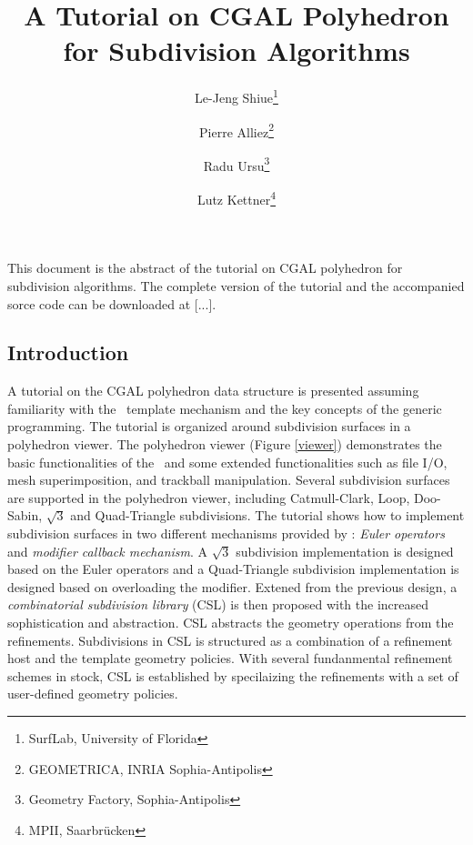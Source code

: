\documentclass[letter,twocolumn]{article}
\begin{document}
\date{}
\title{{\LARGE {\sffamily\bfseries A Tutorial on CGAL Polyhedron \\
                                   for Subdivision Algorithms}}}


\author{\small
\sffamily Le-Jeng Shiue\footnote{SurfLab, University of Florida}
\and \small
\sffamily Pierre Alliez\footnote{GEOMETRICA, INRIA Sophia-Antipolis}
\and \small
\sffamily Radu Ursu\footnote{Geometry Factory, Sophia-Antipolis}
\and \small
\sffamily Lutz Kettner\footnote{MPII, Saarbr\"ucken}}
\maketitle

\thispagestyle{empty}

{\scriptsize
This document is the abstract of the tutorial on CGAL
polyhedron for subdivision algorithms. The complete 
version of the tutorial and the accompanied sorce code 
can be downloaded at [...].
}

\subsection*{Introduction}

A tutorial on the CGAL polyhedron data structure
is presented assuming familiarity with the \CC\ 
template mechanism and the key concepts of the generic 
programming. The tutorial is organized around
subdivision surfaces in a polyhedron viewer.
The polyhedron viewer (Figure \ref{viewer}) demonstrates the
basic functionalities of the \cgalpoly\ and some extended
functionalities such as file I/O, mesh superimposition, and trackball
manipulation. Several subdivision surfaces are supported
in the polyhedron viewer, including Catmull-Clark, Loop, 
Doo-Sabin, $\sqrt{3}$ and Quad-Triangle subdivisions. 
The tutorial shows how to implement subdivision
surfaces in two different mechanisms provided by \cgalpoly :
\emph{Euler operators} and \emph{modifier callback mechanism}. 
A $\sqrt{3}$ subdivision implementation is designed based on the
Euler operators and a Quad-Triangle subdivision implementation
is designed based on overloading the modifier.  
Extened from the previous design, a 
\emph{combinatorial subdivision library} (CSL) is
then proposed with the increased sophistication and 
abstraction. CSL abstracts the geometry operations from 
the refinements. Subdivisions in CSL is structured as a 
combination of a refinement host and the template geometry 
policies. With several fundanmental refinement schemes in stock,
CSL is established by specilaizing the refinements with a set of 
user-defined geometry policies.
\end{document}
